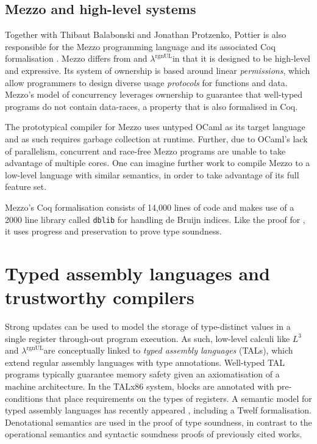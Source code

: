 \documentclass[]{unswthesis}
\newcommand{\rgnUL}{$\lambda^\text{rgnUL}$\text{ }}
\newcommand{\SSPHS}{\text{SSPHS }}
\begin{document}
\subsection{Mezzo and high-level systems}

Together with Thibaut Balabonski and Jonathan Protzenko, Pottier is also responsible for the Mezzo programming language and its associated Coq formalisation \cite{mezzo14}. Mezzo differs from \SSPHS and \rgnUL in that it is designed to be high-level and expressive. Its system of ownership is based around linear \textit{permissions}, which allow programmers to design diverse usage \textit{protocols} for functions and data. Mezzo's model of concurrency leverages ownership to guarantee that well-typed programs do not contain data-races, a property that is also formalised in Coq.

The prototypical compiler for Mezzo uses untyped OCaml as its target language and as such requires garbage collection at runtime. Further, due to OCaml's lack of parallelism, concurrent and race-free Mezzo programs are unable to take advantage of multiple cores. One can imagine further work to compile Mezzo to a low-level language with similar semantics, in order to take advantage of its full feature set.

Mezzo's Coq formalisation consists of 14,000 lines of code and makes use of a 2000 line library called \texttt{dblib} for handling de Bruijn indices. Like the proof for \SSPHS, it uses progress and preservation to prove type soundness.




\section{Typed assembly languages and trustworthy compilers}

Strong updates can be used to model the storage of type-distinct values in a single register through-out program execution. As such, low-level calculi like $L^3$ and \rgnUL are conceptually linked to \textit{typed assembly languages} (TALs), which extend regular assembly languages with type annotations. Well-typed TAL programs typically guarantee memory safety given an axiomatisation of a machine architecture. In the TALx86 \cite{crary99} system, blocks are annotated with pre-conditions that place requirements on the types of registers. A semantic model for typed assembly languages has recently appeared \cite{ahmed10}, including a Twelf formalisation. Denotational semantics are used in the proof of type soundness, in contrast to the operational semantics and syntactic soundness proofs of previously cited works.
\end{document}
